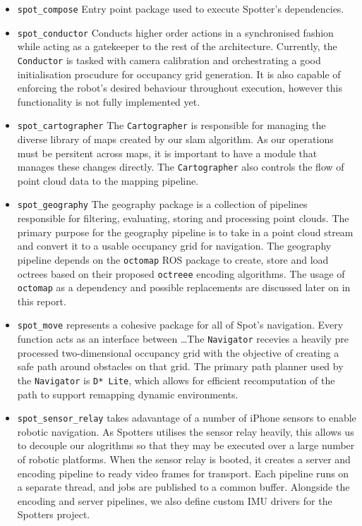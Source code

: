 \documentclass[10pt,english]{article}
\begin{document}
\begin{itemize}[noitemsep]
    \item \texttt{spot\_compose} Entry point package used to execute Spotter's dependencies.
    \item \texttt{spot\_conductor} Conducts higher order actions in a synchronised fashion while acting as a gatekeeper to the rest of the architecture. Currently, the \texttt{Conductor} is tasked with camera calibration and orchestrating a good initialisation procudure for occupancy grid generation. It is also capable of enforcing the robot's desired behaviour throughout execution, however this functionality is not fully implemented yet.
    \item \texttt{spot\_cartographer} The \texttt{Cartographer} is responsible for managing the diverse library of maps created by our slam algorithm. As our operations must be persitent across maps, it is important to have a module that manages these changes directly. The \texttt{Cartographer} also controls the flow of point cloud data to the mapping pipeline.
    \item \texttt{spot\_geography} The geography package is a collection of pipelines responsible for filtering, evaluating, storing and processing point clouds. The primary purpose for the geography pipeline is to take in a point cloud stream and convert it to a usable occupancy grid for navigation. The geography pipeline depends on the \texttt{octomap} ROS package to create, store and load octrees based on their proposed \texttt{octreee} encoding algorithms. The usage of \texttt{octomap} as a dependency and possible replacements are discussed later on in this report.
    \item \texttt{spot\_move} represents a cohesive package for all of Spot's navigation. Every function acts as an interface between \dots The \texttt{Navigator} recevies a heavily pre processed two-dimensional occupancy grid with the objective of creating a safe path around obstacles on that grid. The primary path planner used by the \texttt{Navigator} is \texttt{D* Lite}, which allows for efficient recomputation of the path to support remapping dynamic environments.
    \item \texttt{spot\_sensor\_relay} takes adavantage of a number of iPhone sensors to enable robotic navigation. As Spotters utilises the sensor relay heavily, this allows us to decouple our alogrithms so that they may be executed over a large number of robotic platforms. When the sensor relay is booted, it creates a server and encoding pipeline to ready video frames for transport. Each pipeline runs on a separate thread, and jobs are published to a common buffer. Alongside the encoding and server pipelines, we also define custom IMU drivers for the Spotters project.

\end{itemize}
\end{document}
